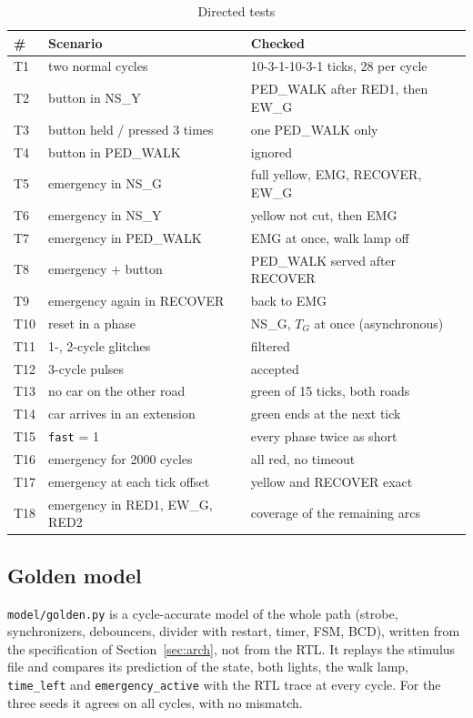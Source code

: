 \documentclass[conference]{IEEEtran}
\newcommand{\code}[1]{\texttt{\upshape #1}}
\newcommand{\st}[1]{\textsf{#1}}         %
\begin{document}
\begin{table}[t]
\centering
\caption{Directed tests}
\label{tab:tests}
\scriptsize
\setlength{\tabcolsep}{3pt}
\begin{tabular}{@{}l p{3.5cm} p{3.6cm}@{}}
\toprule
\# & Scenario & Checked \\
\midrule
T1 & two normal cycles & 10-3-1-10-3-1 ticks, 28 per cycle \\
T2 & button in \st{NS\_Y} & \st{PED\_WALK} after \st{RED1}, then \st{EW\_G} \\
T3 & button held / pressed 3 times & one \st{PED\_WALK} only \\
T4 & button in \st{PED\_WALK} & ignored \\
T5 & emergency in \st{NS\_G} & full yellow, \st{EMG}, \st{RECOVER}, \st{EW\_G} \\
T6 & emergency in \st{NS\_Y} & yellow not cut, then \st{EMG} \\
T7 & emergency in \st{PED\_WALK} & \st{EMG} at once, walk lamp off \\
T8 & emergency + button & \st{PED\_WALK} served after \st{RECOVER} \\
T9 & emergency again in \st{RECOVER} & back to \st{EMG} \\
T10 & reset in a phase & \st{NS\_G}, $T_G$ at once (asynchronous) \\
T11 & 1-, 2-cycle glitches & filtered \\
T12 & 3-cycle pulses & accepted \\
T13 & no car on the other road & green of 15 ticks, both roads \\
T14 & car arrives in an extension & green ends at the next tick \\
T15 & \code{fast} = 1 & every phase twice as short \\
T16 & emergency for 2000 cycles & all red, no timeout \\
T17 & emergency at each tick offset & yellow and \st{RECOVER} exact \\
T18 & emergency in \st{RED1}, \st{EW\_G}, \st{RED2} & coverage of the remaining arcs \\
\bottomrule
\end{tabular}
\end{table}

\subsection{Golden model}
\code{model/golden.py} is a cycle-accurate model of the whole path (strobe,
synchronizers, debouncers, divider with restart, timer, FSM, BCD), written from
the specification of Section~\ref{sec:arch}, not from the RTL. It replays the
stimulus file and compares its prediction of the state, both lights, the walk lamp,
\code{time\_left} and \code{emergency\_active} with the RTL trace at every cycle.
For the three seeds it agrees on all \GoldenCycles{} cycles, with no mismatch.
\end{document}
